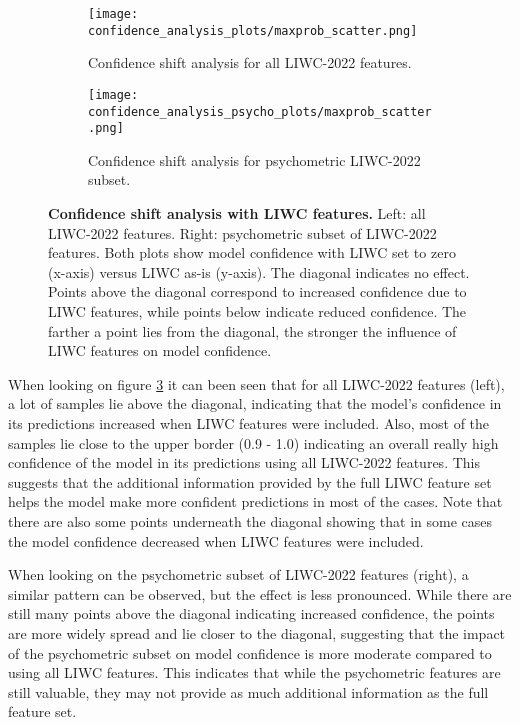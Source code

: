 \begin{figure}[H]
  \centering
  
  \begin{subfigure}[t]{0.49\textwidth}
    \centering
    \texttt{[image: confidence\_analysis\_plots/maxprob\_scatter.png]}
    \caption{Confidence shift analysis for all LIWC-2022 features.}
    \label{fig:confshift_all}
  \end{subfigure}\hfill
  \begin{subfigure}[t]{0.49\textwidth}
    \centering
    \texttt{[image: confidence\_analysis\_psycho\_plots/maxprob\_scatter.png]}
    \caption{Confidence shift analysis for psychometric LIWC-2022 subset.}
    \label{fig:confshift_psycho}
  \end{subfigure}

  \caption[Confidence shift analysis with LIWC features.]{\textbf{Confidence shift analysis with LIWC features.} 
  Left: all LIWC-2022 features. Right: psychometric subset of LIWC-2022 features. 
  Both plots show model confidence with LIWC set to zero (x-axis) versus LIWC as-is (y-axis). 
  The diagonal indicates no effect. 
  Points above the diagonal correspond to increased confidence due to LIWC features, while points below indicate reduced confidence. 
  The farther a point lies from the diagonal, the stronger the influence of LIWC features on model confidence. }
  \label{fig:confidence_shift}

\end{figure}


When looking on figure \ref{fig:confidence_shift} it can been seen that for all LIWC-2022 features (left), a lot of samples lie above the diagonal, indicating that the model's confidence in its predictions increased when LIWC features were included. Also, most of the samples lie close to the upper border (0.9 - 1.0) indicating an overall really high confidence of the model in its predictions using all LIWC-2022 features.
This suggests that the additional information provided by the full LIWC feature set helps the model make more confident predictions in most of the cases. Note that there are also some points underneath the diagonal showing that in some cases the model confidence decreased when LIWC features were included. 

When looking on the psychometric subset of LIWC-2022 features (right), a similar pattern can be observed, but the effect is less pronounced. While there are still many points above the diagonal indicating increased confidence, the points are more widely spread and lie closer to the diagonal, suggesting that the impact of the psychometric subset on model confidence is more moderate compared to using all LIWC features. This indicates that while the psychometric features are still valuable, they may not provide as much additional information as the full feature set.


